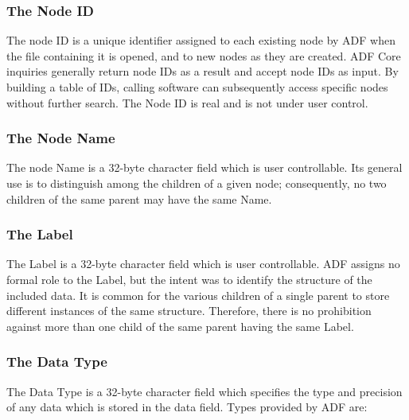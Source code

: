 \subsubsection{The Node ID}

The node ID is a unique identifier assigned to each existing node by
ADF when the file containing it is opened, and to new nodes as they are
created. ADF Core inquiries generally return node IDs as a result and
accept node IDs as input. By building a table of IDs, calling software
can subsequently access specific nodes without further search. The Node
ID is real and is not under user control.

\subsubsection{The Node Name}

The node Name is a 32-byte character field which is user
controllable. Its general use is to distinguish among the children of a
given node; consequently, no two children of the same parent may have
the same Name.

\subsubsection{The Label}

The Label is a 32-byte character field which is user controllable. ADF
assigns no formal role to the Label, but the intent was to identify
the structure of the included data. It is common for the various
children of a single parent to store different instances of the same
structure. Therefore, there is no prohibition against more than one
child of the same parent having the same Label.

\subsubsection{The Data Type}

The Data Type is a 32-byte character field which specifies the type and
precision of any data which is stored in the data field. Types provided
by ADF are:


